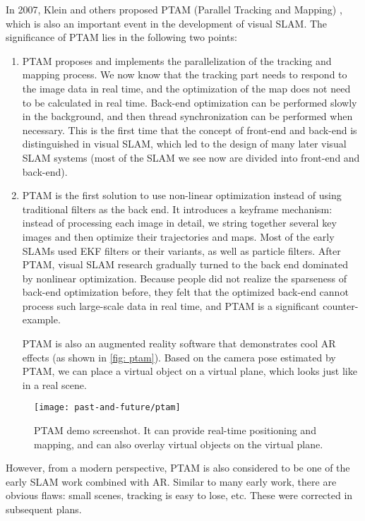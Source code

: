 In 2007, Klein and others proposed PTAM (Parallel Tracking and Mapping) \textsuperscript{\cite{Klein2007}}, which is also an important event in the development of visual SLAM. The significance of PTAM lies in the following two points:
\clearpage
\begin{enumerate}
\item PTAM proposes and implements the parallelization of the tracking and mapping process. We now know that the tracking part needs to respond to the image data in real time, and the optimization of the map does not need to be calculated in real time. Back-end optimization can be performed slowly in the background, and then thread synchronization can be performed when necessary. This is the first time that the concept of front-end and back-end is distinguished in visual SLAM, which led to the design of many later visual SLAM systems (most of the SLAM we see now are divided into front-end and back-end).
\item PTAM is the first solution to use non-linear optimization instead of using traditional filters as the back end. It introduces a keyframe mechanism: instead of processing each image in detail, we string together several key images and then optimize their trajectories and maps. Most of the early SLAMs used EKF filters or their variants, as well as particle filters. After PTAM, visual SLAM research gradually turned to the back end dominated by nonlinear optimization. Because people did not realize the sparseness of back-end optimization before, they felt that the optimized back-end cannot process such large-scale data in real time, and PTAM is a significant counter-example.

\hspace{2em} PTAM is also an augmented reality software that demonstrates cool AR effects (as shown in \autoref{fig: ptam}). Based on the camera pose estimated by PTAM, we can place a virtual object on a virtual plane, which looks just like in a real scene.
\end{enumerate}

\begin{figure}[! ht]
\centering
\texttt{[image: past-and-future/ptam]}
\caption{PTAM demo screenshot. It can provide real-time positioning and mapping, and can also overlay virtual objects on the virtual plane. }
\label{fig: ptam}
\end{figure}

\clearpage
However, from a modern perspective, PTAM is also considered to be one of the early SLAM work combined with AR. Similar to many early work, there are obvious flaws: small scenes, tracking is easy to lose, etc. These were corrected in subsequent plans.

